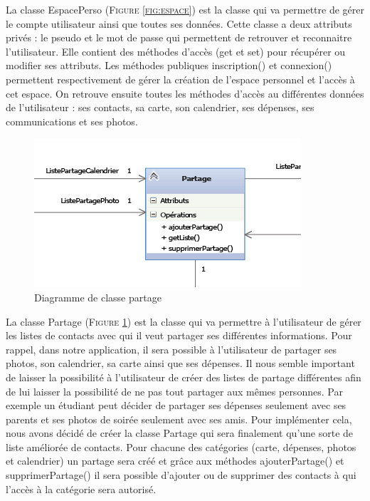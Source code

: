 \documentclass[11pt]{article}
\begin{document}
La classe EspacePerso (\textsc{Figure \ref{fig:espace}}) est la classe qui va permettre de gérer le compte utilisateur ainsi que toutes ses données. Cette classe a deux attributs privés : le pseudo et le mot de passe qui permettent de retrouver et reconnaitre l'utilisateur. Elle contient des méthodes d'accès (get et set) pour récupérer ou modifier ses attributs. Les méthodes publiques inscription() et connexion() permettent respectivement de gérer la création de l'espace personnel et l'accès à cet espace. On retrouve ensuite toutes les méthodes d'accès au différentes données de l'utilisateur : ses contacts, sa carte, son calendrier, ses dépenses, ses communications et ses photos. 


\begin{figure}[!h]
        \centering \includegraphics[scale=2]{partage.png}
        \caption{Diagramme de classe partage}
         \label{fig:partage}
\end{figure}

La classe Partage (\textsc{Figure \ref{fig:partage}}) est la classe qui va permettre à l'utilisateur de gérer les listes de contacts avec qui il veut partager ses différentes informations. 
Pour rappel, dans notre application, il sera possible à l'utilisateur de partager ses photos, son calendrier, sa carte ainsi que ses dépenses. Il nous semble important de laisser la possibilité à l'utilisateur de créer des listes de partage différentes afin de lui laisser la possibilité de ne pas tout partager aux mêmes personnes. Par exemple un étudiant peut décider de partager ses dépenses seulement avec ses parents et ses photos de soirée seulement avec ses amis. 
Pour implémenter cela, nous avons décidé de créer la classe Partage qui sera finalement qu'une sorte de liste améliorée de contacts. Pour chacune des catégories (carte, dépenses, photos et calendrier) un partage sera créé et grâce aux méthodes ajouterPartage() et supprimerPartage() il sera possible d'ajouter ou de supprimer des contacts à qui l'accès à la catégorie sera autorisé.
\end{document}

